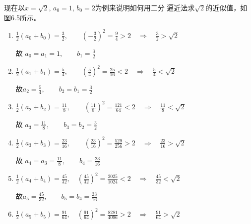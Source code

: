 现在以$x=\sqrt{2}$, $a_0=1$, $b_0=2$为例来说明如何用二分
逼近法求$\sqrt{2}$的近似值，如图6.5所示。
\begin{figure}[htp]
    \centering
{}
    \caption{}
\end{figure}

\begin{enumerate}
    \item  $\frac{1}{2}\left(a_{0}+b_{0}\right)=\frac{3}{2},\qquad \left(-\frac{3}{2}\right)^{2}=\frac{9}{4}>2 \quad\Rightarrow\quad\frac{3}{2}>\sqrt{2}$
    
    故 $a_{0}=a_{1}=1,\qquad   b_{1}=\frac{3}{2}$

    \item   $\frac{1}{2}\left(a_{1}+b_{1}\right)=\frac{5}{4},\qquad \left(\frac{5}{4}\right)^{2}=\frac{25}{16}<2 \quad\Rightarrow\quad \frac{5}{4}<\sqrt{2}$
    
    故$a_{2}=\frac{5}{4}, \qquad  b_{2}=b_{1}=\frac{3}{2}$

    \item  $\frac{1}{2}\left(a_{2}+b_{2}\right)=\frac{11}{8},\qquad \left(\frac{11}{8}\right)^{2}=\frac{121}{64}<2 \quad\Rightarrow\quad \frac{11}{8}<\sqrt{2}$
    
    故 $a_{3}=\frac{11}{8},\qquad  b_{3}=b_{2}=\frac{3}{2}$

    \item   $\frac{1}{2}\left(a_{3}+b_{3}\right)=\frac{23}{16},\qquad \left(\frac{23}{16}\right)^{2}=\frac{529}{256}>2 \quad\Rightarrow\quad \frac{23}{16}>\sqrt{2}$
    
    故 $a_{4}=a_{3}=\frac{11}{8},\qquad  b_{4}=\frac{23}{16}$

    \item  $\frac{1}{2}\left(a_{4}+b_{4}\right)=\frac{45}{32},\quad \left(\frac{45}{32}\right)^{2}=\frac{2025}{1024}<2 \quad\Rightarrow\quad \frac{45}{32}<\sqrt{2}$
    
     故$a_{5}=\frac{45}{32}, \qquad b_{5}=b_{4}=\frac{23}{16}
    $
    
    \item  $\frac{1}{2}\left(a_{5}+b_{5}\right)=\frac{91}{64},\quad \left(\frac{91}{64}\right)^{2}=\frac{8281}{4096}>2 \quad\Rightarrow\quad \frac{91}{64}>\sqrt{2}$
    

\end{enumerate}
